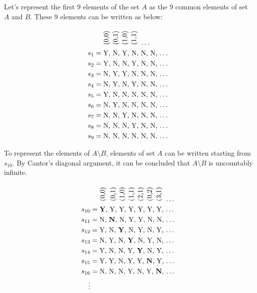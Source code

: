 \documentclass[11pt]{article}
\begin{document}
	Let's represent the first 9 elements of the set $A$ as the 9 common elements of set $A$ and $B$. These 9 elements can be written as below:
	\begin{center}
		\begin{align*}
			& \ \ \ \ \rotatebox{90}{(0,0) } \  \rotatebox{90}{(0,1)} \  \rotatebox{90}{(1,0)} \  \rotatebox{90}{(1,1)} \ \dots\\
			s_1 &= \text{Y, N, Y, N, N, N, $\dots$}\\
			s_2 &= \text{Y, N, N, Y, N, N, $\dots$}\\
			s_3 &= \text{N, Y, Y, N, N, N, $\dots$}\\
			s_4 &= \text{N, Y, N, Y, N, N, $\dots$}\\
			s_5 &= \text{Y, N, N, N, N, N, $\dots$}\\
			s_6 &= \text{N, Y, N, N, N, N, $\dots$}\\
			s_7 &= \text{N, N, Y, N, N, N, $\dots$}\\
			s_8 &= \text{N, N, N, Y, N, N, $\dots$}\\
			s_9 &= \text{N, N, N, N, N, N, $\dots$}\\
		\end{align*}
	\end{center}
	
	To represent the elements of $A \setminus B$, elements of set $A$ can be written starting from $s_{10}$. By Cantor's diagonal argument, it can be concluded that $A \setminus B$ is uncountably infinite.

	\begin{center}
		\begin{align*}
			& \ \ \ \ \rotatebox{90}{(0,0) } \ \, \rotatebox{90}{(0,1)} \ \rotatebox{90}{(1,0)} \  \rotatebox{90}{(1,1)} \ \rotatebox{90}{(2,1)} \ \rotatebox{90}{(0,2)} \ \rotatebox{90}{(3,1)} \ \dots\\
			s_{10} &= \text{\textbf{Y}, Y, Y, Y, Y, Y, Y, $\dots$}\\
			s_{11} &= \text{N, \textbf{N}, N, Y, Y, N, N, $\dots$}\\
			s_{12} &= \text{Y, N, \textbf{Y}, N, Y, N, Y, $\dots$}\\
			s_{13} &= \text{N, Y, N, \textbf{Y}, N, Y, N, $\dots$}\\
			s_{14} &= \text{Y, N, N, Y, \textbf{Y}, N, Y, $\dots$}\\
			s_{15} &= \text{Y, Y, N, Y, Y, \textbf{N}, Y, $\dots$}\\
			s_{16} &= \text{N, N, N, Y, N, Y, \textbf{N}, $\dots$}\\
			\vdots &
		\end{align*}
	\end{center}
		
\end{document}
